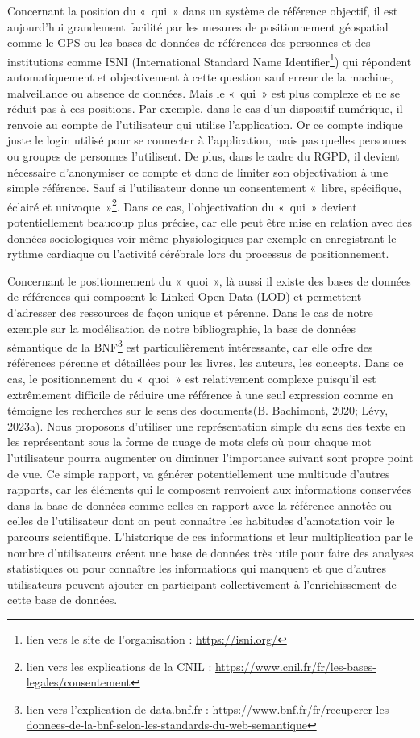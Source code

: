 \documentclass[
  a4paper,
  DIV=11,
  numbers=noendperiod]{scrreprt}
\begin{document}
Concernant la position du «~qui~» dans un système de référence objectif,
il est aujourd'hui grandement facilité par les mesures de positionnement
géospatial comme le GPS ou les bases de données de références des
personnes et des institutions comme ISNI (International Standard Name
Identifier\footnote{lien vers le site de l'organisation :
  \url{https://isni.org/}}) qui répondent automatiquement et
objectivement à cette question sauf erreur de la machine, malveillance
ou absence de données. Mais le «~qui~» est plus complexe et ne se réduit
pas à ces positions. Par exemple, dans le cas d'un dispositif numérique,
il renvoie au compte de l'utilisateur qui utilise l'application. Or ce
compte indique juste le login utilisé pour se connecter à l'application,
mais pas quelles personnes ou groupes de personnes l'utilisent. De plus,
dans le cadre du RGPD, il devient nécessaire d'anonymiser ce compte et
donc de limiter son objectivation à une simple référence. Sauf si
l'utilisateur donne un consentement «~libre, spécifique, éclairé et
univoque~»\footnote{lien vers les explications de la CNIL :
  \url{https://www.cnil.fr/fr/les-bases-legales/consentement}}. Dans ce
cas, l'objectivation du «~qui~» devient potentiellement beaucoup plus
précise, car elle peut être mise en relation avec des données
sociologiques voir même physiologiques par exemple en enregistrant le
rythme cardiaque ou l'activité cérébrale lors du processus de
positionnement.

Concernant le positionnement du «~quoi~», là aussi il existe des bases
de données de références qui composent le Linked Open Data (LOD) et
permettent d'adresser des ressources de façon unique et pérenne. Dans le
cas de notre exemple sur la modélisation de notre bibliographie, la base
de données sémantique de la BNF\footnote{lien vers l'explication de
  data.bnf.fr :
  \url{https://www.bnf.fr/fr/recuperer-les-donnees-de-la-bnf-selon-les-standards-du-web-semantique}}
est particulièrement intéressante, car elle offre des références pérenne
et détaillées pour les livres, les auteurs, les concepts. Dans ce cas,
le positionnement du «~quoi~» est relativement complexe puisqu'il est
extrêmement difficile de réduire une référence à une seul expression
comme en témoigne les recherches sur le sens des documents(B. Bachimont,
2020; Lévy, 2023a). Nous proposons d'utiliser une représentation simple
du sens des texte en les représentant sous la forme de nuage de mots
clefs où pour chaque mot l'utilisateur pourra augmenter ou diminuer
l'importance suivant sont propre point de vue. Ce simple rapport, va
générer potentiellement une multitude d'autres rapports, car les
éléments qui le composent renvoient aux informations conservées dans la
base de données comme celles en rapport avec la référence annotée ou
celles de l'utilisateur dont on peut connaître les habitudes
d'annotation voir le parcours scientifique. L'historique de ces
informations et leur multiplication par le nombre d'utilisateurs créent
une base de données très utile pour faire des analyses statistiques ou
pour connaître les informations qui manquent et que d'autres
utilisateurs peuvent ajouter en participant collectivement à
l'enrichissement de cette base de données.
\end{document}
